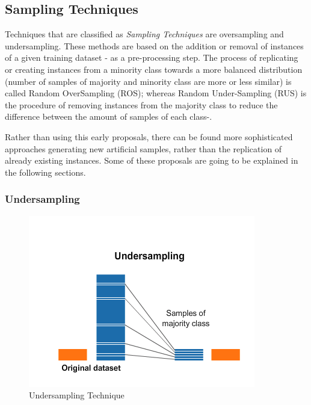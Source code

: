 \subsection{Sampling Techniques}
\label{subsec:samlpingTech}

Techniques that are classified as \textit{Sampling Techniques} are oversampling 
and undersampling. These methods are based on the addition or removal of 
instances of a given training dataset - as a pre-processing step. The process 
of replicating or creating instances from a minority class towards a more 
balanced distribution (number of samples of majority and minority class are
more or less similar) is called Random OverSampling (ROS); whereas Random 
Under-Sampling (RUS) is the procedure of removing instances from the majority 
class to reduce the difference between the amount of samples of each class-.

Rather than using this early proposals, there can be found more sophisticated 
approaches generating new artificial samples, rather than the replication of 
already existing instances. Some of these proposals are going to be explained 
in the following sections. 

\subsubsection{Undersampling}\label{sec:undersampling}

\begin{figure}[h!]
\centering
\includegraphics[width=.7\textwidth]{figures/Undersampling.png}
\caption{Undersampling Technique \cite{OverUnderIbm2019}}
\label{fig:undersampling}
\end{figure}

